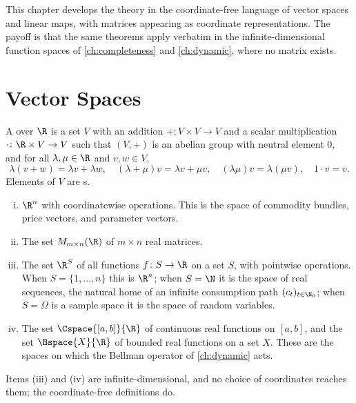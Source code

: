 This chapter develops the theory in the coordinate-free language of vector spaces
and linear maps, with matrices appearing as coordinate representations. The
payoff is that the same theorems apply verbatim in the infinite-dimensional
function spaces of \autoref{ch:completeness} and \autoref{ch:dynamic}, where no
matrix exists.

\section{Vector Spaces}\label{sec:lin-vs}

\begin{definition}\label{def:vector-space}
	A  over $\R$ is a set $V$ with an addition
	$+\colon V\times V\to V$ and a scalar multiplication
	$\cdot\colon\R\times V\to V$ such that $(V,+)$ is an abelian group with neutral
	element $0$, and for all $\lambda,\mu\in\R$ and $v,w\in V$,
	\[
		\lambda(v+w)=\lambda v+\lambda w,\quad
		(\lambda+\mu)v=\lambda v+\mu v,\quad
		(\lambda\mu)v=\lambda(\mu v),\quad
		1\cdot v=v.
	\]
	Elements of $V$ are s.
\end{definition}

\begin{eg}\label{eg:vector-spaces}
	\begin{enumerate}[(i)]
		\item $\R^n$ with coordinatewise operations. This is the space of commodity
		      bundles, price vectors, and parameter vectors.
		\item The set $M_{m\times n}(\R)$ of $m\times n$ real matrices.
		\item The set $\R^S$ of all functions $f\colon S\to\R$ on a set $S$, with
		      pointwise operations. When $S=\{1,\dots,n\}$ this is $\R^n$; when
		      $S=\N$ it is the space of real sequences, the natural home of an
		      infinite consumption path $(c_t)_{t\in\N_0}$; when $S=\Omega$ is a sample
		      space it is the space of random variables.
		\item The set $\Cspace{[a,b]}{\R}$ of continuous real functions on $[a,b]$, and
		      the set $\Bspace{X}{\R}$ of bounded real functions on a set $X$. These are
		      the spaces on which the Bellman operator of \autoref{ch:dynamic} acts.
	\end{enumerate}
	Items (iii) and (iv) are infinite-dimensional, and no choice of coordinates
	reaches them; the coordinate-free definitions do.
\end{eg}

